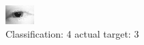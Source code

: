 \begin{figure}[h!]
\begin{center}
\includegraphics[width=0.60\columnwidth]{figures/ID161_class_4_target_3.png}
\end{center}
\caption{ Classification: 4 actual target: 3}
\label{fig:ID161_class_4_target_3}
\end{figure}
